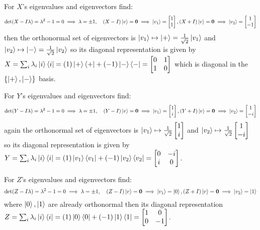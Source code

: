 \documentclass[12pt]{exam}
\begin{document}
\begin{solution}
    For $X$'s eigenvalues and eigenvectors find:
    $$\det(X-I\lambda) = \lambda^2 -1 = 0 \implies \lambda = \pm 1, 
    \quad (X - I)\ket{v} = \textbf{0} \implies \ket{v_1} = \begin{bmatrix} 1 \\ 1 \end{bmatrix}, 
    (X+I)\ket{v} = \textbf{0} \implies \ket{v_2} = \begin{bmatrix} 1 \\ -1 \end{bmatrix}$$
    then the orthonormal set of eigenvectors is $\ket{v_1} \mapsto \ket{+} = \frac{1}{\sqrt{2}}\ket{v_1}$ and $\ket{v_2} \mapsto \ket{-}=\frac{1}{\sqrt{2}}\ket{v_2}$ so its diagonal representation is given by $X = \sum_i \lambda_i\ket{i}\bra{i} = (1)\ket{+}\bra{+} + (-1)\ket{-}\bra{-} = \begin{bmatrix} 0 & 1 \\ 1 & 0 \end{bmatrix}
    $ which is diagonal in the $\{\ket{+},\ket{-}\}$ basis.

    For $Y$'s eigenvalues and eigenvectors find:
    $$\det(Y-I\lambda) = \lambda^2 - 1 = 0 \implies \lambda = \pm 1, \quad 
    (Y - I)\ket{v} = \textbf{0} \implies \ket{v_1} = \begin{bmatrix} 1 \\ i \end{bmatrix}, 
    (Y+I)\ket{v} = \textbf{0} \implies \ket{v_2} = \begin{bmatrix} 1 \\ -i \end{bmatrix}
    $$
    again the orthonormal set of eigenvectors is $\ket{v_1} \mapsto \frac{1}{\sqrt{2}}\begin{bmatrix} 1 \\ i \end{bmatrix}$ and $\ket{v_2} \mapsto \frac{1}{\sqrt{2}}\begin{bmatrix} 1 \\ -i \end{bmatrix}$ so its diagonal representation is given by $Y = \sum_i \lambda_i\ket{i}\bra{i} = (1)\ket{v_1}\bra{v_1} + (-1)\ket{v_2}\bra{v_2} = \begin{bmatrix} 0 & -i \\ i & 0 \end{bmatrix}
    $.

    For $Z$'s eigenvalues and eigenvectors find:
    $$\det(Z-I\lambda) = \lambda^2 - 1 = 0 \implies \lambda = \pm 1, \quad 
    (Z - I)\ket{v} = \textbf{0} \implies \ket{v_1} = \ket{0}, 
    (Z+I)\ket{v} = \textbf{0} \implies \ket{v_2} = \ket{1}
    $$
    where $\ket{0}, \ket{1}$ are already orthonormal then its diagonal representation $Z = \sum_i \lambda_i\ket{i}\bra{i} = (1)\ket{0}\bra{0} + (-1)\ket{1}\bra{1} = \begin{bmatrix} 1 & 0 \\ 0 & -1 \end{bmatrix}
    $.
\end{solution}
\end{document}
